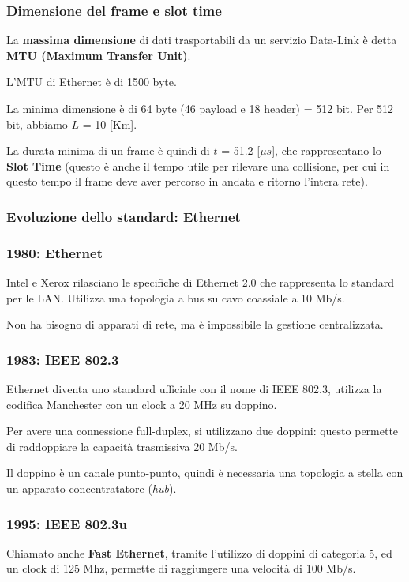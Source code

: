         \subsubsection{Dimensione del frame e slot time}
            La \textbf{massima dimensione} di dati trasportabili da un servizio Data-Link è detta \textbf{MTU (Maximum Transfer Unit)}.

            L'MTU di Ethernet è di 1500 byte.

            La minima dimensione è di 64 byte (46 payload e 18 header) = 512 bit. Per 512 bit, abbiamo $L$ = 10 [Km].

            La durata minima di un frame è quindi di $t$ = 51.2 [$\mu s$], che rappresentano lo \textbf{Slot Time} (questo è anche il tempo utile per rilevare una collisione, per cui in questo tempo il frame deve aver percorso in andata e ritorno l'intera rete).

        \subsubsection{Evoluzione dello standard: Ethernet}
            \subsubsection*{1980: Ethernet}
            Intel e Xerox rilasciano le specifiche di Ethernet 2.0 che rappresenta lo standard per le LAN. Utilizza una topologia a bus su cavo coassiale a 10 Mb/s.
        
            Non ha bisogno di apparati di rete, ma è impossibile la gestione centralizzata.
        
            \subsubsection*{1983: IEEE 802.3}
            Ethernet diventa uno standard ufficiale con il nome di IEEE 802.3, utilizza la codifica Manchester con un clock a 20 MHz su doppino.

            Per avere una connessione full-duplex, si utilizzano due doppini: questo permette di raddoppiare la capacità trasmissiva 20 Mb/s.

            Il doppino è un canale punto-punto, quindi è necessaria una topologia a stella con un apparato concentratatore (\textit{hub}).

            \subsubsection*{1995: IEEE 802.3u}
            Chiamato anche \textbf{Fast Ethernet}, tramite l'utilizzo di doppini di categoria 5, ed un clock di 125 Mhz, permette di raggiungere una velocità di 100 Mb/s.

